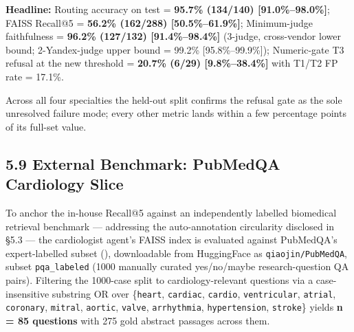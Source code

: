 \documentclass[
  american,
  a4paper,
]{article}
\begin{document}
\textbf{Headline:} Routing accuracy on test = \textbf{95.7\% (134/140)
{[}91.0\%--98.0\%{]}}; FAISS Recall@5 = \textbf{56.2\% (162/288)
{[}50.5\%--61.9\%{]}}; Minimum-judge faithfulness = \textbf{96.2\%
(127/132) {[}91.4\%--98.4\%{]}} (3-judge, cross-vendor lower bound;
2-Yandex-judge upper bound = 99.2\% {[}95.8\%--99.9\%{]}); Numeric-gate
T3 refusal at the new threshold = \textbf{20.7\% (6/29)
{[}9.8\%--38.4\%{]}} with T1/T2 FP rate = 17.1\%.

Across all four specialties the held-out split confirms the refusal gate
as the sole unresolved failure mode; every other metric lands within a
few percentage points of its full-set value.

\subsection{5.9 External Benchmark: PubMedQA Cardiology
Slice}\label{external-benchmark-pubmedqa-cardiology-slice}

To anchor the in-house Recall@5 against an independently labelled
biomedical retrieval benchmark --- addressing the auto-annotation
circularity disclosed in §5.3 --- the cardiologist agent's FAISS index
is evaluated against PubMedQA's expert-labelled subset
(), downloadable from
HuggingFace as \texttt{qiaojin/PubMedQA}, subset \texttt{pqa\_labeled}
(1000 manually curated yes/no/maybe research-question QA pairs).
Filtering the 1000-case split to cardiology-relevant questions via a
case-insensitive substring OR over \{\texttt{heart}, \texttt{cardiac},
\texttt{cardio}, \texttt{ventricular}, \texttt{atrial},
\texttt{coronary}, \texttt{mitral}, \texttt{aortic}, \texttt{valve},
\texttt{arrhythmia}, \texttt{hypertension}, \texttt{stroke}\} yields
\textbf{n = 85 questions} with 275 gold abstract passages across them.
\end{document}
